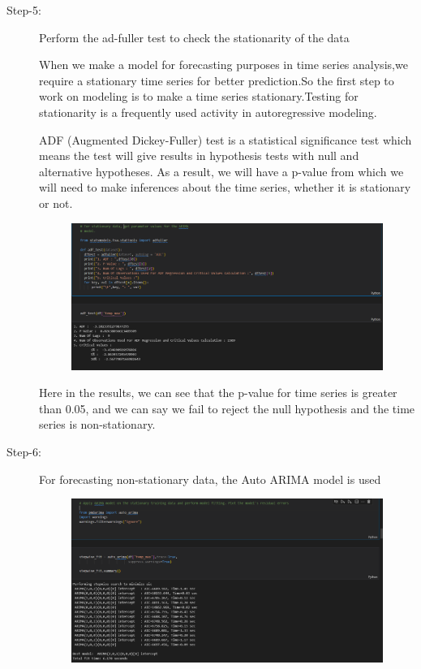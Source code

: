 \begin{description}
\item[Step-5:] Perform the ad-fuller test to check the stationarity of the data

When we make a model for forecasting purposes in time series analysis,we require a stationary time series for better prediction.So the first step to work on modeling is to make a time series stationary.Testing for stationarity is a frequently used activity in autoregressive modeling.

ADF (Augmented Dickey-Fuller) test is a statistical significance test which means the test will give results in hypothesis tests with null and alternative hypotheses. As a result, we will have a p-value from which we will need to make inferences about the time series, whether it is stationary or not.

 \begin{figure}[hbt!]
  \centering
  \includegraphics[width=0.8\linewidth]{images/outputs/5.png}
\end{figure}
Here in the results, we can see that the p-value for time series is greater than 0.05, and we can say we fail to reject the null hypothesis and the time series is non-stationary.
\pagebreak
\item[Step-6:] For forecasting non-stationary data, the Auto ARIMA model is used

 \begin{figure}[hbt!]
  \centering
  \includegraphics[width=0.8\linewidth]{images/outputs/6.png}
\end{figure}


\end{description}
